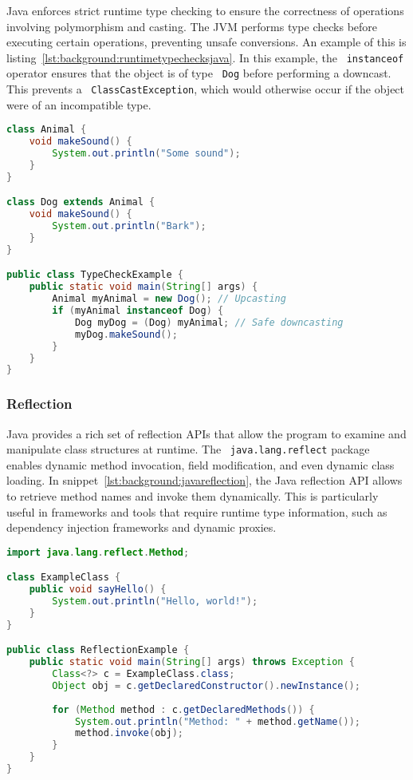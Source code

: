 Java enforces strict runtime type checking to ensure the correctness of operations involving polymorphism and casting. The JVM performs type checks before executing certain operations, preventing unsafe conversions. An example of this is listing~\ref{lst:background:runtimetypechecksjava}. In this example, the ~\lstinline|instanceof| operator ensures that the object is of type ~\lstinline|Dog| before performing a downcast. This prevents a ~\lstinline|ClassCastException|, which would otherwise occur if the object were of an incompatible type.


\begin{lstlisting}[language=Java,caption=Runtime typechecks in Java,label=lst:background:runtimetypechecksjava]
class Animal {
	void makeSound() {
		System.out.println("Some sound");
	}
}

class Dog extends Animal {
	void makeSound() {
		System.out.println("Bark");
	}
}

public class TypeCheckExample {
	public static void main(String[] args) {
		Animal myAnimal = new Dog(); // Upcasting
		if (myAnimal instanceof Dog) {
			Dog myDog = (Dog) myAnimal; // Safe downcasting
			myDog.makeSound();
		}
	}
}
\end{lstlisting}

\subsubsection{Reflection}

Java provides a rich set of reflection APIs that allow the program to examine and manipulate class structures at runtime. The ~\lstinline|java.lang.reflect| package enables dynamic method invocation, field modification, and even dynamic class loading. In snippet~\ref{lst:background:javareflection}, the Java reflection API allows to retrieve method names and invoke them dynamically. This is particularly useful in frameworks and tools that require runtime type information, such as dependency injection frameworks and dynamic proxies.

\begin{lstlisting}[language=Java,caption=Reflection in Java,label=lst:background:javareflection]
import java.lang.reflect.Method;

class ExampleClass {
	public void sayHello() {
		System.out.println("Hello, world!");
	}
}

public class ReflectionExample {
	public static void main(String[] args) throws Exception {
		Class<?> c = ExampleClass.class;
		Object obj = c.getDeclaredConstructor().newInstance();
		
		for (Method method : c.getDeclaredMethods()) {
			System.out.println("Method: " + method.getName());
			method.invoke(obj);
		}
	}
}
\end{lstlisting}


